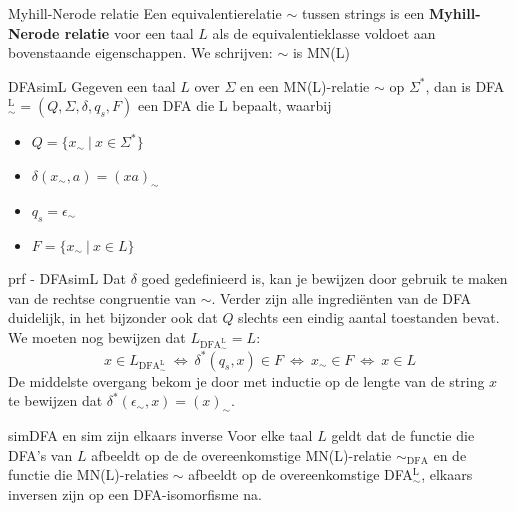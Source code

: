 \begin{theo}{Myhill-Nerode relatie}
    Een equivalentierelatie $\sim$ tussen strings is een \textbf{Myhill-Nerode relatie} voor een taal $L$ als de equivalentieklasse
    voldoet aan bovenstaande eigenschappen. We schrijven: $\sim$ is MN(L)
\end{theo}

\begin{lem}{DFAsimL}
    Gegeven een taal $L$ over $\Sigma$ en een MN(L)-relatie $\sim$ op $\Sigma^*$, dan is DFA$_{\sim}^{\text{L}} = (Q, \Sigma, \delta, q_s, F)$ een DFA die L bepaalt, waarbij
    \begin{itemize}
        \item $Q = \{x_{\sim} \ | \ x \in \Sigma^* \}$
        \item $\delta(x_{\sim},a) = (xa)_{\sim}$
        \item $q_s = \epsilon_{\sim}$
        \item $F = \{x_{\sim} \ | \ x \in L \}$
    \end{itemize}  
    \vspace{-0.3cm}
\end{lem}

\begin{prf}{prf - DFAsimL}
    Dat $\delta$ goed gedefinieerd is, kan je bewijzen door gebruik te maken van de rechtse congruentie van $\sim$.
    Verder zijn alle ingrediënten van de DFA duidelijk, in het bijzonder ook dat $Q$ slechts een eindig aantal toestanden bevat.
    We moeten nog bewijzen dat $L_{\text{DFA}_{\sim}^{\text{L}}} = L$:
    \begin{equation*}
        x \in L_{\text{DFA}_{\sim}^{\text{L}}} \ \Leftrightarrow \ \delta^*(q_s,x) \in F \ \Leftrightarrow \ x_{\sim} \in F \ \Leftrightarrow \ x \in L
    \end{equation*}
    De middelste overgang bekom je door met inductie op de lengte van de string $x$ te bewijzen dat $\delta^*(\epsilon_{\sim},x) = (x)_{\sim}$.
\end{prf}

\begin{lem}{simDFA en sim zijn elkaars inverse}
    Voor elke taal $L$ geldt dat de functie die DFA's van $L$ afbeeldt op de de overeenkomstige MN(L)-relatie $\sim_{\text{DFA}}$ en de functie 
    die MN(L)-relaties $\sim$ afbeeldt op de overeenkomstige DFA$_{\sim}^{\text{L}}$, elkaars inversen zijn op een DFA-isomorfisme na.
\end{lem}

